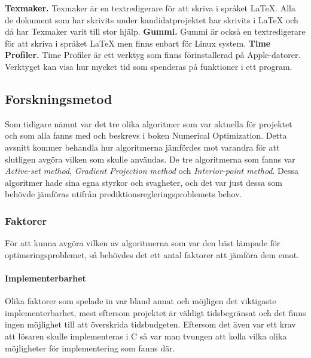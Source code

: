 \newline
\newline
\textbf{Texmaker.} Texmaker är en textredigerare för att skriva i språket \LaTeX. Alla de dokument som har skrivits under kandidatprojektet har skrivits i {\LaTeX} och då har Texmaker varit till stor hjälp.
\newline
\newline
\textbf{Gummi.} Gummi är också en textredigerare för att skriva i språket {\LaTeX} men finns enbart för Linux system.
\newline
\newline
\textbf{Time Profiler.} Time Profiler är ett verktyg som finns förinstallerad på Apple-datorer. Verktyget kan visa hur mycket tid som spenderas på funktioner i ett program. 
\subsection{Forskningsmetod}
Som tidigare nämnt var det tre olika algoritmer som var aktuella för projektet och som alla fanns med och beskrevs i boken Numerical Optimization. Detta avsnitt kommer behandla hur algoritmerna jämfördes mot varandra för att slutligen avgöra vilken som skulle användas.
\newline
\newline
De tre algoritmerna som fanns var \emph{Active-set method}, \emph{Gradient Projection method} och \emph{Interior-point method}. Dessa algoritmer hade sina egna styrkor och svagheter, och det var just dessa som behövde jämföras utifrån prediktionsregleringsproblemets behov.

\subsubsection{Faktorer}
För att kunna avgöra vilken av algoritmerna som var den bäst lämpade för optimeringsproblemet, så behövdes det ett antal faktorer att jämföra dem emot.

\paragraph{Implementerbarhet}
Olika faktorer som spelade in var bland annat och möjligen det viktigaste implementerbarhet, mest eftersom projektet är väldigt tidsbegränsat och det finns ingen möjlighet till att överskrida tidsbudgeten. Eftersom det även var ett krav att lösaren skulle implementeras i C så var man tvungen att kolla vilka olika möjligheter för implementering som fanns där.

